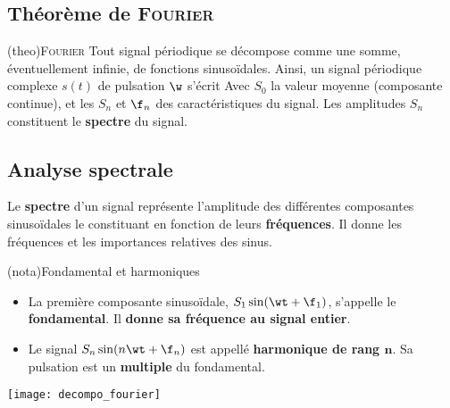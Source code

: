 \documentclass[../../main/main.tex]{subfiles}
\begin{document}
\subsection{Théorème de \textsc{Fourier}}
\begin{tcb*}[breakable](theo){\textsc{Fourier}}
	Tout signal périodique se décompose comme une somme, éventuellement infinie,
	de fonctions sinusoïdales. Ainsi, un signal périodique complexe $s(t)$ de
	pulsation $\w$ s'écrit
	\psw{
		\[
			s(t) = S_0 + \sum_{n=1}^{+\infty} S_n \sin(n\w t + \f_n)
			\Lra
			s(t) = S_0 + \sum_{n=1}^{+\infty} S_n \sin(2\pi nf t + \f_n)
		\]
	}%
	Avec $S_0$ la valeur moyenne (composante continue), et les $S_n$ et $\f_n$ des
	caractéristiques du signal. Les amplitudes $S_n$ constituent le
	\textbf{spectre} du signal.
\end{tcb*}

\subsection{Analyse spectrale}

\noindent
\begin{minipage}[t]{.48\linewidth}
	Le \textbf{spectre} d’un signal représente l’amplitude des différentes
	composantes sinusoïdales le constituant en fonction de leurs
	\textbf{fréquences}. Il donne les fréquences et les importances relatives des
	sinus.
	\begin{tcb}(nota){Fondamental et harmoniques}
		\begin{itemize}
			\item La première composante sinusoïdale, $S_1 \sin(\wt + \f_1)$,
			      s'appelle le \textbf{fondamental}. Il \textbf{donne sa fréquence au
				      signal entier}.
			\item Le signal $S_n \sin(n\wt + \f_n)$ est appellé
			      \textbf{harmonique de rang $\mathbf{n}$}. Sa pulsation est un
			      \textbf{multiple} du fondamental.
		\end{itemize}
	\end{tcb}
\end{minipage}
\hfill
\begin{minipage}[t]{.48\linewidth}
	\vspace{-10pt}
	\begin{center}
		\texttt{[image: decompo\_fourier]}
		\label{fig:fourier}
	\end{center}
\end{minipage}
\end{document}
